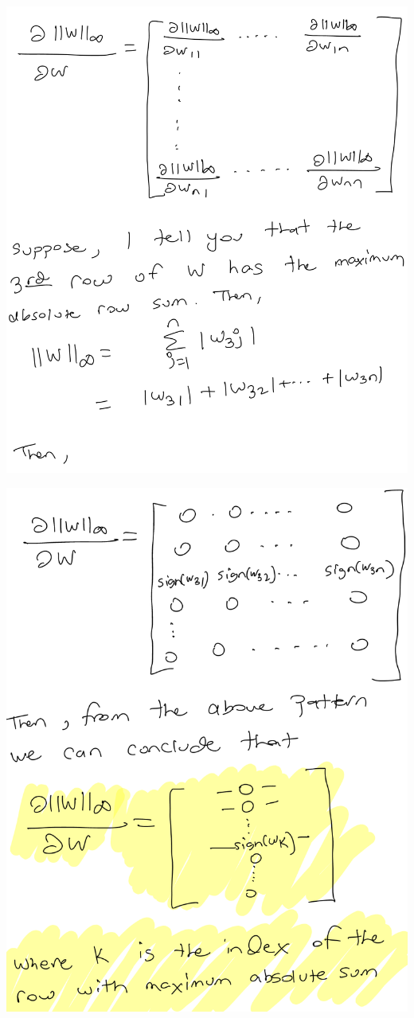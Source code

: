 \documentclass{article}
\begin{document}
\begin{minipage}{2.6in}
\includegraphics[scale=0.22]{d53.png}
\end{minipage}
\begin{minipage}{2.6in}
\includegraphics[scale=0.22]{d54.png}
\end{minipage}
\end{document}
